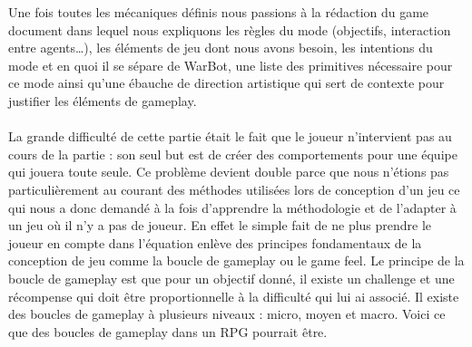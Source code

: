 \documentclass{report}
\begin{document}
  Une fois toutes les mécaniques définis nous passions à la rédaction du game document dans lequel nous expliquons les règles du mode (objectifs, interaction entre agents…), les éléments de jeu dont nous avons besoin, les intentions du mode et en quoi il se sépare de WarBot, une liste des primitives nécessaire pour ce mode ainsi qu’une ébauche de direction artistique qui sert de contexte pour justifier les éléments de gameplay.
\paragraph{}

  La grande difficulté de cette partie était le fait que le joueur n’intervient pas au cours de la partie : son seul but est de créer des comportements pour une équipe qui jouera toute seule. Ce problème devient double parce que nous n’étions pas particulièrement au courant des méthodes utilisées lors de conception d'un jeu ce qui nous a donc demandé à la fois d’apprendre la méthodologie et de l’adapter à un jeu où il n’y a pas de joueur. \newline
En effet le simple fait de ne plus prendre le joueur en compte dans l’équation enlève des principes fondamentaux de la conception de jeu comme la boucle de gameplay ou le game feel. 
Le principe de la boucle de gameplay est que  pour un objectif donné, il existe un challenge et une récompense qui doit être proportionnelle à la difficulté qui lui ai associé. Il existe des boucles de gameplay à plusieurs niveaux : micro, moyen et macro. Voici ce que des boucles de gameplay dans un RPG pourrait être.
\end{document}
